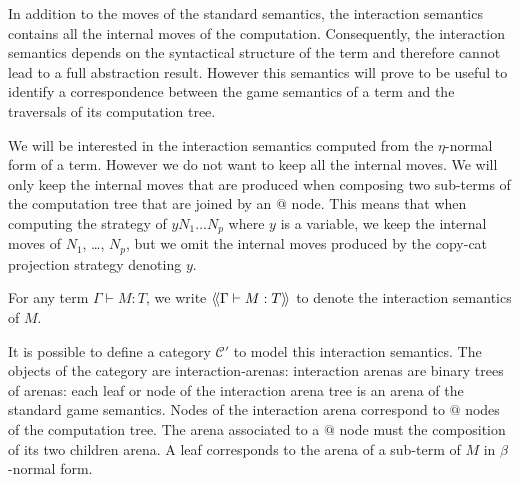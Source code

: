 In addition to the moves of the standard semantics, the interaction semantics contains all
the internal moves of the computation.
Consequently, the interaction semantics depends on the syntactical structure of the term and therefore cannot
lead to a full abstraction result. However this semantics will prove to be useful to identify
a correspondence between the game semantics
of a term and the traversals of its computation tree.

We will be interested in the interaction semantics computed from the
$\eta$-normal form of a term. However we do not want to keep all the internal moves. We will only keep the internal
moves that are produced when composing two sub-terms of the computation tree that are joined by an $@$ node.
This means that when computing the strategy of
$y N_1 \ldots N_p$ where $y$ is a variable, we keep the internal moves of $N_1$, \ldots, $N_p$, but
we omit the internal moves produced by the copy-cat projection strategy denoting $y$.

For any term $\Gamma \vdash M : T$, we write ${\langle\!\langle \Gamma \vdash M : T \rangle\!\rangle}$ to denote the interaction semantics of $M$.

It is possible to define a category $\mathcal{C'}$ to model this interaction semantics. The objects of
the category are interaction-arenas: interaction arenas
are binary trees of arenas: each leaf or node of the interaction arena tree is an arena of the standard game semantics.
Nodes of the interaction arena correspond to $@$ nodes of the computation tree. The arena associated to a $@$ node must
the composition of its two children arena. A leaf corresponds to the arena of a sub-term of $M$ in $\beta$-normal form.

